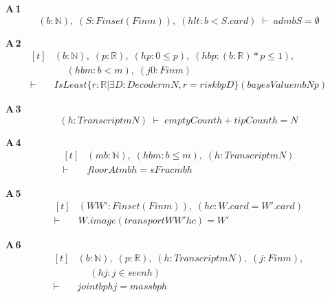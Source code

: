 \noindent\textbf{A\,1}\quad{}
{\footnotesize\[ (\mathit{b} : \mathbb{N} ),\; (\mathit{S} : \mathit{Finset} (\mathit{Fin} \mathit{m})),\; (\mathit{hlt} : \mathit{b} < \mathit{S}.\mathit{card}) \;\vdash\; \mathit{adm} \mathit{b} \mathit{S} = \emptyset \]}

\noindent\textbf{A\,2}\quad{}
{\footnotesize\[ \begin{aligned}[t]
&(\mathit{b} : \mathbb{N} ),\; (\mathit{p} : \mathbb{R} ),\; (\mathit{hp} : 0 \leq \mathit{p}),\; (\mathit{hbp} : (\mathit{b} : \mathbb{R} ) * \mathit{p} \leq 1),\\
&\quad \; (\mathit{hbm} : \mathit{b} < \mathit{m}),\; (\mathit{j0} : \mathit{Fin} \mathit{m})\\
\vdash\;&\mathit{IsLeast} \{ \mathit{r} : \mathbb{R} | \exists \mathit{D} : \mathit{Decoder} \mathit{m} \mathit{N}, \mathit{r} = \mathit{risk} \mathit{b} \mathit{p} \mathit{D}\} (\mathit{bayesValue} \mathit{m} \mathit{b} \mathit{N} \mathit{p})
\end{aligned} \]}

\noindent\textbf{A\,3}\quad{}
{\footnotesize\[ (\mathit{h} : \mathit{Transcript} \mathit{m} \mathit{N}) \;\vdash\; \mathit{emptyCount} \mathit{h} + \mathit{tipCount} \mathit{h} = \mathit{N} \]}

\noindent\textbf{A\,4}\quad{}
{\footnotesize\[ \begin{aligned}[t]
&(\mathit{m} \mathit{b} : \mathbb{N} ),\; (\mathit{hbm} : \mathit{b} \leq \mathit{m}),\; (\mathit{h} : \mathit{Transcript} \mathit{m} \mathit{N})\\
\vdash\;&\mathit{floorAt} \mathit{m} \mathit{b} \mathit{h} = \mathit{sFrac} \mathit{m} \mathit{b} \mathit{h}
\end{aligned} \]}

\noindent\textbf{A\,5}\quad{}
{\footnotesize\[ \begin{aligned}[t]
&(\mathit{W} \mathit{W'} : \mathit{Finset} (\mathit{Fin} \mathit{m})),\; (\mathit{hc} : \mathit{W}.\mathit{card} = \mathit{W'}.\mathit{card})\\
\vdash\;&\mathit{W}.\mathit{image} (\mathit{transport} \mathit{W} \mathit{W'} \mathit{hc}) = \mathit{W'}
\end{aligned} \]}

\noindent\textbf{A\,6}\quad{}
{\footnotesize\[ \begin{aligned}[t]
&(\mathit{b} : \mathbb{N} ),\; (\mathit{p} : \mathbb{R} ),\; (\mathit{h} : \mathit{Transcript} \mathit{m} \mathit{N}),\; (\mathit{j} : \mathit{Fin} \mathit{m}),\\
&\quad \; (\mathit{hj} : \mathit{j} \in \mathit{seen} \mathit{h})\\
\vdash\;&\mathit{joint} \mathit{b} \mathit{p} \mathit{h} \mathit{j} = \mathit{mass} \mathit{b} \mathit{p} \mathit{h}
\end{aligned} \]}

